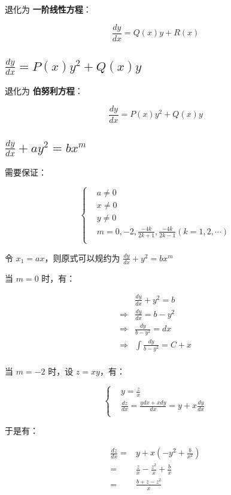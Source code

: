 \documentclass[UTF8]{article}
\begin{document}
退化为 \textbf{一阶线性方程}：

$$
\frac{dy}{dx} = Q(x)y+R(x)
$$

\subsection{$\frac{dy}{dx} = P(x)y^2+Q(x)y$}

退化为 \textbf{伯努利方程}：

$$
\frac{dy}{dx} = P(x)y^2+Q(x)y
$$

\subsection{$\frac{dy}{dx} + ay^2 = bx^m$}

需要保证：

$$
\begin{cases}
& a \not= 0 \\
& x \not= 0 \\
& y \not= 0 \\
& m = 0, -2, \frac{ -4k }{ 2k+1 }, \frac{ -4k }{ 2k-1 } ( k = 1, 2, \cdots ) \\
\end{cases}
$$

令 $x_1=ax$，则原式可以规约为 $\frac{dy}{dx} + y^2=bx^m$

当 $m=0$ 时，有：

$$
\begin{aligned}
& \frac{dy}{dx} + y^2 = b \\
\Rightarrow & \frac{dy}{dx} = b - y^2 \\
\Rightarrow & \frac{dy}{b-y^2} = dx \\
\Rightarrow & \int \frac{dy}{b-y^2} = C + x \\
\end{aligned}
$$

当 $m = -2$ 时，设 $z = xy$，有：

$$
\begin{cases}
& y=\frac{z}{x} \\
& \frac{dz}{dx} = \frac{ydx+xdy}{dx} = y + x\frac{dy}{dx} \\
\end{cases}
$$

于是有：

$$
\begin{aligned}
\frac{dz}{dx}
= & y + x\left(-y^2 + \frac{b}{x^2}\right) \\
= & \frac{z}{x} - \frac{z^2}{x} + \frac{b}{x} \\
= & \frac{b + z - z^2}{x} \\
\end{aligned}
$$
\end{document}
